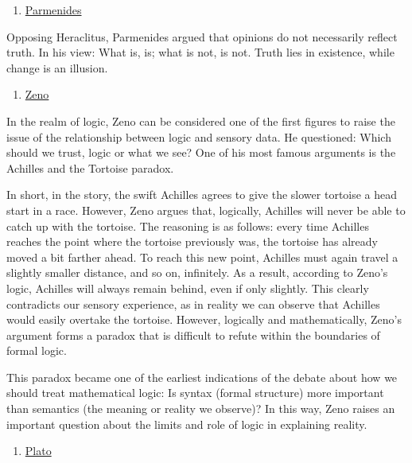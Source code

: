 \begin{enumerate}
\def\labelenumi{\alph{enumi})}
\setcounter{enumi}{4}
\tightlist
\item
  \href{https://en.wikipedia.org/wiki/Parmenides}{Parmenides}
\end{enumerate}

Opposing Heraclitus, Parmenides argued that opinions do not necessarily
reflect truth. In his view: What is, is; what is not, is not. Truth lies
in existence, while change is an illusion.

\begin{enumerate}
\def\labelenumi{\alph{enumi})}
\setcounter{enumi}{5}
\tightlist
\item
  \href{https://simple.wikipedia.org/wiki/Zeno_of_Elea}{Zeno}
\end{enumerate}

In the realm of logic, Zeno can be considered one of the first figures
to raise the issue of the relationship between logic and sensory data.
He questioned: Which should we trust, logic or what we see? One of his
most famous arguments is the Achilles and the Tortoise paradox.

In short, in the story, the swift Achilles agrees to give the slower
tortoise a head start in a race. However, Zeno argues that, logically,
Achilles will never be able to catch up with the tortoise. The reasoning
is as follows: every time Achilles reaches the point where the tortoise
previously was, the tortoise has already moved a bit farther ahead. To
reach this new point, Achilles must again travel a slightly smaller
distance, and so on, infinitely. As a result, according to Zeno's logic,
Achilles will always remain behind, even if only slightly. This clearly
contradicts our sensory experience, as in reality we can observe that
Achilles would easily overtake the tortoise. However, logically and
mathematically, Zeno's argument forms a paradox that is difficult to
refute within the boundaries of formal logic.

This paradox became one of the earliest indications of the debate about
how we should treat mathematical logic: Is syntax (formal structure)
more important than semantics (the meaning or reality we observe)? In
this way, Zeno raises an important question about the limits and role of
logic in explaining reality.

\begin{enumerate}
\def\labelenumi{\alph{enumi})}
\setcounter{enumi}{5}
\tightlist
\item
  \href{https://simple.wikipedia.org/wiki/Plato}{Plato}
\end{enumerate}

